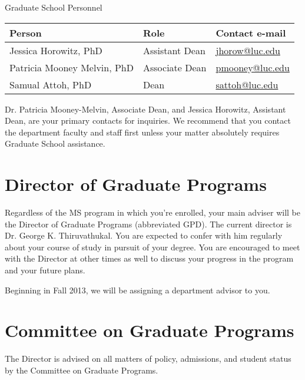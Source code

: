 \documentclass[letterpaper,10pt,english]{sphinxmanual}
\begin{document}
\begin{threeparttable}
\capstart\caption{Graduate School Personnel}

\begin{tabulary}{\linewidth}{|L|L|L|}
\hline
\textbf{
Person
} & \textbf{
Role
} & \textbf{
Contact e-mail
}\\\hline

Jessica Horowitz, PhD
 & 
Assistant Dean
 & 
\href{mailto:jhorow@luc.edu}{jhorow@luc.edu}
\\\hline

Patricia Mooney Melvin, PhD
 & 
Associate Dean
 & 
\href{mailto:pmooney@luc.edu}{pmooney@luc.edu}
\\\hline

Samual Attoh, PhD
 & 
Dean
 & 
\href{mailto:sattoh@luc.edu}{sattoh@luc.edu}
\\\hline
\end{tabulary}

\end{threeparttable}


Dr. Patricia Mooney-Melvin, Associate Dean, and Jessica Horowitz, Assistant Dean, are your primary contacts for inquiries. We recommend that you contact the department faculty and
staff first unless your matter absolutely requires Graduate School assistance.


\section{Director of Graduate Programs}
\label{general:director-of-graduate-programs}
Regardless of the MS program in which you're enrolled, your main adviser will be the Director of Graduate Programs (abbreviated GPD). The current director is Dr. George K. Thiruvathukal. You are expected to confer with him regularly about your course of study in pursuit of your degree. You are encouraged to meet with the Director at other times as well to discuss your progress in the program and your future plans.

Beginning in Fall 2013, we will be assigning a department advisor to you.


\section{Committee on Graduate Programs}
\label{general:committee-on-graduate-programs}
The Director is advised on all matters of policy, admissions, and student status by the Committee on Graduate Programs.
\end{document}
